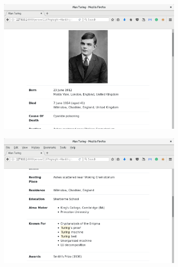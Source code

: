 \documentclass[11pt,a4paper]{article}
\begin{document}
\begin{figure}[H]
	\centering
	\begin{subfigure}{.49\textwidth}
		\centering
		\includegraphics[width=\linewidth]{turing-1.png}
	\end{subfigure}
	\hfill
	\begin{subfigure}{.49\textwidth}
		\centering
		\includegraphics[width=\linewidth]{turing-2.png}
	\end{subfigure}
	\vspace{0.5cm}
	\begin{subfigure}{.49\textwidth}
		\centering

\end{subfigure}
\end{figure}
\end{document}
